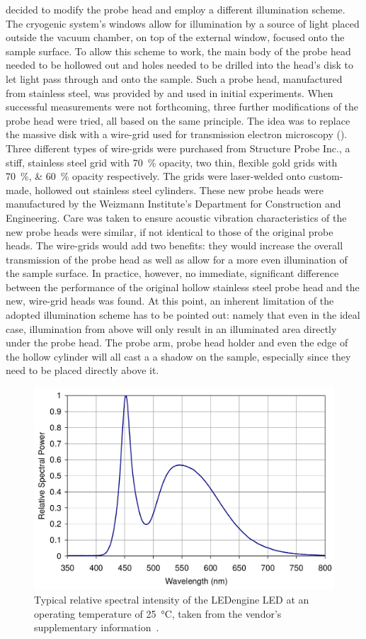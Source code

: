 decided to modify the probe head and employ a different illumination scheme. The cryogenic system's windows allow for illumination by a source of light placed outside the vacuum chamber, on top of the external window, focused onto the sample surface. To allow this scheme to work, the main body of the probe head needed to be hollowed out and holes needed to be drilled into the head's disk to let light pass through and onto the sample. Such a probe head, manufactured from stainless steel, was provided by \McA{} and used in initial experiments. When successful measurements were not forthcoming, three further modifications of the probe head were tried, all based on the same principle. The idea was to replace the massive disk with a wire-grid used for transmission electron microscopy (\tem{}). Three different types of wire-grids were purchased from Structure Probe Inc., a stiff, stainless steel grid with \SI{70}{\percent} opacity, two thin, flexible gold grids with \SIlist{70;60}{\percent} opacity respectively. The grids were laser-welded onto custom-made, hollowed out stainless steel cylinders. These new probe heads were manufactured by the Weizmann Institute's Department for Construction and Engineering. Care was taken to ensure acoustic vibration characteristics of the new probe heads were similar, if not identical to those of the original \McA{} probe heads. The wire-grids would add two benefits: they would increase the overall transmission of the probe head as well as allow for a more even illumination of the sample surface. In practice, however, no immediate, significant difference between the performance of the original hollow stainless steel probe head and the new, \tem{} wire-grid heads was found. At this point, an inherent limitation of the adopted illumination scheme has to be pointed out: namely that even in the ideal case, illumination from above will only result in an illuminated area directly under the probe head. The probe arm, probe head holder and even the edge of the hollow cylinder will all cast a a shadow on the sample, especially since they need to be placed directly above it.\\
\begin{figure}
\centering
	\includegraphics[width=0.8\linewidth]{./figs/chap2/ledspec}
	\caption{Typical relative spectral intensity of the LEDengine LED at an operating temperature of \SI{25}{\degreeCelsius}, taken from the vendor's supplementary information~\cite[p. 10]{ledengin}.}
	\label{fig:ledspec}
\end{figure}
